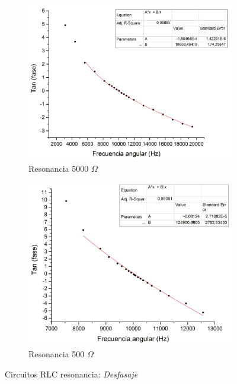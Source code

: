 \documentclass[11pt,a4paper]{article}
\begin{document}
\begin{figure}[h]
\begin{subfigure}{0.5\textwidth}
\includegraphics[scale=0.34]{RLC_RES_5000_Tan(fase)vsF}
  \caption{Resonancia 5000 $\Omega$}
  \label{subfig:RES_D.a}
\end{subfigure}
\begin{subfigure}{0.5\textwidth}
\includegraphics[scale=0.34]{RLC_RES_500_Tan(fase)vsF}
  \caption{Resonancia 500 $\Omega$}
  \label{subfig:RES_D.b}
\end{subfigure}
  \caption{Circuitos RLC resonancia: \textit{Desfasaje}}
  \label{fig:RES_D}
\end{figure}
\end{document}
